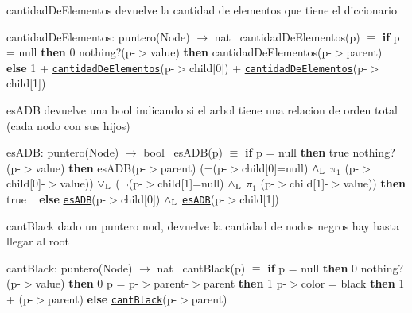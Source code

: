 \begin{DoxyParagraph}{cantidad\+De\+Elementos}
devuelve la cantidad de elementos que tiene el diccionario

cantidad\+De\+Elementos\+: puntero(\+Node) $\to$ nat~\newline
 cantidad\+De\+Elementos(p) $\equiv$ {\bfseries if} p = null {\bfseries then} 0  nothing?(p-\/$>$value) {\bfseries then} cantidad\+De\+Elementos(p-\/$>$parent) ~\newline
 {\bfseries else} 1 + \href{axiomas.html#cantidadDeElementos}{\tt cantidad\+De\+Elementos}(p-\/$>$child\mbox{[}0\mbox{]}) + \href{axiomas.html#cantidadDeElementos}{\tt cantidad\+De\+Elementos}(p-\/$>$child\mbox{[}1\mbox{]}) 
\end{DoxyParagraph}


\begin{DoxyParagraph}{es\+A\+DB}
devuelve una bool indicando si el arbol tiene una relacion de orden total (cada nodo con sus hijos)

es\+A\+DB\+: puntero(\+Node) $\to$ bool~\newline
 es\+A\+D\+B(p) $\equiv$ {\bfseries if} p = null {\bfseries then} true  nothing?(p-\/$>$value) {\bfseries then} es\+A\+DB(p-\/$>$parent)  (¬(p-\/$>$child\mbox{[}0\mbox{]}=null) $\land_{\rm L}$ $\pi_1$ (p-\/$>$child\mbox{[}0\mbox{]}-\/$>$value)) $\lor_{\rm L}$ (¬(p-\/$>$child\mbox{[}1\mbox{]}=null) $\land_{\rm L}$ $\pi_1$ (p-\/$>$child\mbox{[}1\mbox{]}-\/$>$value)) {\bfseries then} true ~\newline
 {\bfseries else} \href{axiomas.html#esADB}{\tt es\+A\+DB}(p-\/$>$child\mbox{[}0\mbox{]}) $\land_{\rm L}$ \href{axiomas.html#esADB}{\tt es\+A\+DB}(p-\/$>$child\mbox{[}1\mbox{]}) 
\end{DoxyParagraph}


\begin{DoxyParagraph}{cant\+Black}
dado un puntero nod, devuelve la cantidad de nodos negros hay hasta llegar al root

cant\+Black\+: puntero(\+Node) $\to$ nat~\newline
 cant\+Black(p) $\equiv$ {\bfseries if} p = null {\bfseries then} 0  nothing?(p-\/$>$value) {\bfseries then} 0  p = p-\/$>$parent-\/$>$parent {\bfseries then} 1  p-\/$>$color = black {\bfseries then} 1 + (p-\/$>$parent) {\bfseries else} \href{axiomas.html#cantBlack}{\tt cant\+Black}(p-\/$>$parent) 
\end{DoxyParagraph}


